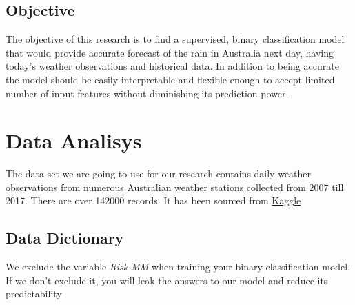 \hypertarget{objective}{%
\subsection{Objective}\label{objective}}

The objective of this research is to find a supervised, binary
classification model that would provide accurate forecast of the rain in
Australia next day, having today's weather observations and historical
data. In addition to being accurate the model should be easily
interpretable and flexible enough to accept limited number of input
features without diminishing its prediction power.

\hypertarget{data-analisys}{%
\section{Data Analisys}\label{data-analisys}}

The data set we are going to use for our research contains daily weather
observations from numerous Australian weather stations collected from
2007 till 2017. There are over 142000 records. It has been sourced from
\href{https://www.kaggle.com/jsphyg/weather-dataset-rattle-package}{Kaggle}

\hypertarget{data-dictionary}{%
\subsection{Data Dictionary}\label{data-dictionary}}

We exclude the variable \emph{Risk-MM} when training your binary
classification model. If we don't exclude it, you will leak the answers
to our model and reduce its predictability


